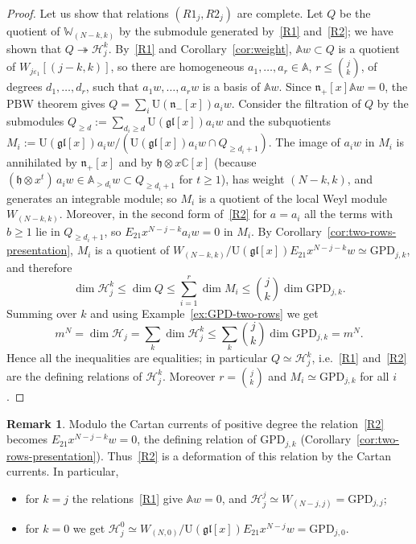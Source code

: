 \documentclass[11pt]{amsart}
\numberwithin{equation}{section}
\theoremstyle{definition}
\newtheorem{remark}[equation]{Remark}
\newcommand{\gl}{\mathfrak{gl}}
\newcommand{\fh}{\mathfrak{h}}
\newcommand{\fn}{\mathfrak{n}}
\newcommand{\U}{\mathrm{U}}
\newcommand{\bW}{\mathbb{W}}          %
\newcommand{\bA}{\mathbb{A}}          %
\newcommand{\GPD}{\mathrm{GPD}}         %
\newcommand{\eps}{\varepsilon}
\begin{document}
\begin{proof}
		
		Let us show that relations $(R1_j, R2_j)$ are complete. Let $Q$ be the quotient of $\bW_{(N-k,k)}$ by the submodule generated by~\ref{R1} and~\ref{R2}; we have shown that $Q\twoheadrightarrow\mathcal H_j^k$. By~\ref{R1} and Corollary~\ref{cor:weight}, $\bA w\subset Q$ is a quotient of $W_{j\eps_1}[(j-k,k)]$, so there are homogeneous $a_1,\dots,a_r\in\bA$, $r\le\binom jk$, of degrees $d_1,\dots,d_r$, such that $a_1w,\dots,a_rw$ is a basis of $\bA w$. Since $\fn_+[x]\bA w=0$, the PBW theorem gives $Q=\sum_i\U(\fn_-[x])a_iw$. Consider the filtration of $Q$ by the submodules $Q_{\ge d}:=\sum_{d_i\ge d}\U(\gl[x])a_iw$ and the subquotients $M_i:=\U(\gl[x])a_iw/(\U(\gl[x])a_iw\cap Q_{\ge d_i+1})$. The image of $a_iw$ in $M_i$ is annihilated by $\fn_+[x]$ and by $\fh\otimes x\mathbb C[x]$ (because $(\fh\otimes x^t)\,a_iw\in\bA_{>d_i}w\subset Q_{\ge d_i+1}$ for $t\ge1$), has weight $(N-k,k)$, and generates an integrable module; so $M_i$ is a quotient of the local Weyl module $W_{(N-k,k)}$. Moreover, in the second form of~\ref{R2} for $a=a_i$ all the terms with $b\ge1$ lie in $Q_{\ge d_i+1}$, so $E_{21}x^{N-j-k}a_iw=0$ in $M_i$. By Corollary~\ref{cor:two-rows-presentation}, $M_i$ is a quotient of $W_{(N-k,k)}/\U(\gl[x])E_{21}x^{N-j-k}w\simeq\GPD_{j,k}$, and therefore
		\[
		\dim\mathcal H_j^k\le\dim Q\le\sum_{i=1}^r\dim M_i\le\binom jk\dim\GPD_{j,k}.
		\]
		Summing over $k$ and using Example~\ref{ex:GPD-two-rows} we get 
		$$m^N=\dim\mathcal H_j=\sum_k\dim\mathcal H_j^k\le\sum_k\binom jk\dim\GPD_{j,k}=m^N.$$
		Hence all the inequalities are equalities; in particular $Q\simeq\mathcal H_j^k$, i.e.\ \ref{R1} and~\ref{R2} are the defining relations of $\mathcal H_j^k$. Moreover $r=\binom jk$ and $M_i\simeq\GPD_{j,k}$ for all $i$.
	\end{proof}
	
	
	
	
	
	
	
	
	\begin{remark}
		Modulo the Cartan currents of positive degree the relation~\ref{R2} becomes $E_{21}x^{N-j-k}w=0$, the defining relation of $\GPD_{j,k}$ (Corollary~\ref{cor:two-rows-presentation}). Thus~\ref{R2} is a deformation of this relation by the Cartan currents. In particular,
		\begin{itemize}[itemsep=0pt,topsep=0pt]
			\item for $k=j$ the relations~\ref{R1} give $\bA w=0$, and $\mathcal H_j^j\simeq W_{(N-j,j)}=\GPD_{j,j}$; 
			\item
			for $k=0$ we get $\mathcal H_j^0\simeq W_{(N,0)}/\U(\gl[x])E_{21}x^{N-j}w=\GPD_{j,0}$.
		\end{itemize}
	\end{remark}
	
\end{document}

